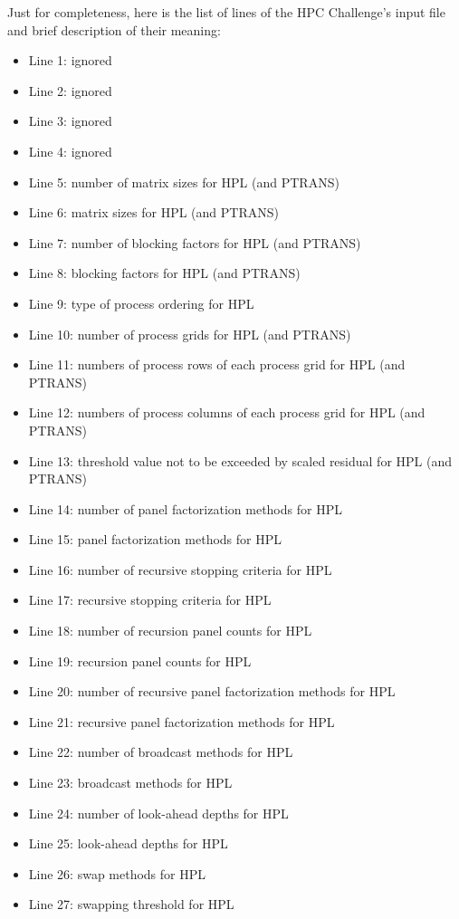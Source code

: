 \documentclass[twocolumn]{article}
\begin{document}
Just for completeness, here is the list of lines of the HPC
Challenge's input file and brief description of their meaning:
\begin{itemize}
\item Line 1: ignored
\item Line 2: ignored
\item Line 3: ignored
\item Line 4: ignored
\item Line 5: number of matrix sizes for HPL (and PTRANS)
\item Line 6: matrix sizes for HPL (and PTRANS)
\item Line 7: number of blocking factors for HPL (and PTRANS)
\item Line 8: blocking factors for HPL (and PTRANS)
\item Line 9: type of process ordering for HPL
\item Line 10: number of process grids for HPL (and PTRANS)
\item Line 11: numbers of process rows of each process grid for HPL (and PTRANS)
\item Line 12: numbers of process columns of each process grid for HPL (and PTRANS)
\item Line 13: threshold value not to be exceeded by scaled residual for HPL (and PTRANS)
\item Line 14: number of panel factorization methods for HPL
\item Line 15: panel factorization methods for HPL
\item Line 16: number of recursive stopping criteria for HPL
\item Line 17: recursive stopping criteria for HPL
\item Line 18: number of recursion panel counts for HPL
\item Line 19: recursion panel counts for HPL
\item Line 20: number of recursive panel factorization methods for HPL
\item Line 21: recursive panel factorization methods for HPL
\item Line 22: number of broadcast methods for HPL
\item Line 23: broadcast methods for HPL
\item Line 24: number of look-ahead depths for HPL
\item Line 25: look-ahead depths for HPL
\item Line 26: swap methods for HPL
\item Line 27: swapping threshold for HPL

\end{itemize}
\end{document}
